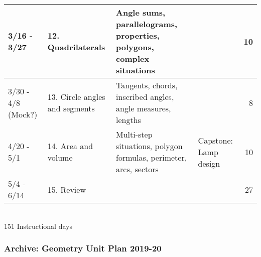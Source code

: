 \documentclass[12pt, twoside]{article}
\begin{document}
\begin{tabular}{|p{2.4cm}|p{4.7cm}|p{9cm}|p{4cm}|r|}
  \hline
  3/16 - 3/27 & 12. Quadrilaterals & Angle sums, parallelograms, properties, polygons, complex situations & & 10 \\
  \hline
  3/30 - 4/8 (Mock?) & 13. Circle angles and segments & Tangents, chords, inscribed angles, angle measures, lengths &  & 8 \\
  \hline
  4/20 - 5/1 & 14. Area and volume & Multi-step situations,  polygon formulas, perimeter, arcs, sectors &Capstone: Lamp design & 10 \\
  \hline
  5/4 - 6/14 & 15. Review &  & & 27 \\
  \hline
\end{tabular} \\[0.25cm]
151 Instructional days

\newpage
\subsubsection*{Archive: Geometry Unit Plan 2019-20}
\end{document}
